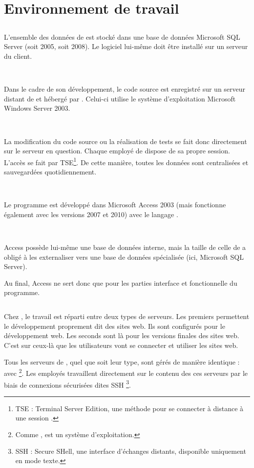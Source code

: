 \chapter{Environnement de travail}
\section{\solulog}
L'ensemble des données de \integrale{} est stocké dans une base de données Microsoft SQL Server (soit 2005, soit 2008). Le logiciel lui-même doit être installé sur un serveur du client.

~

Dans le cadre de son développement, le code source est enregistré sur un serveur distant de \solulog{} et hébergé par \fidit. Celui-ci utilise le système d'exploitation Microsoft Windows Server 2003.

~

La modification du code source ou la réalisation de tests se fait donc directement sur le serveur en question. Chaque employé de \solulog{} dispose de sa propre session. L'accès se fait par TSE\footnote{TSE : Terminal Server Edition, une méthode pour se connecter à distance à une session .}. De cette manière, toutes les données sont centralisées et sauvegardées quotidiennement.

~

Le programme \integrale{} est développé dans Microsoft Access 2003 (mais fonctionne également avec les versions 2007 et 2010) avec le langage \vb.

~

Access possède lui-même une base de données interne, mais la taille de celle de \integrale{} a obligé \solulog{} à les externaliser vers une base de données spécialisée (ici, Microsoft SQL Server).

Au final, Access ne sert donc que pour les parties interface et fonctionnelle du programme.

\section{\fidit}
Chez \fidit, le travail est réparti entre deux types de serveurs. Les premiers permettent le développement proprement dit des sites web. Ils sont configurés pour le développement web. Les seconds sont là pour les versions finales des sites web. C'est sur ceux-là que les utilisateurs vont se connecter et utiliser les sites web.

Tous les serveurs de \fidit, quel que soit leur type, sont gérés de manière identique : avec \footnote{Comme ,  est un système d'exploitation.}. Les employés travaillent directement sur le contenu des ces serveurs par le biais de connexions sécurisées dites \og SSH \fg\footnote{SSH : Secure SHell, une interface d'échanges distants, disponible uniquement en mode texte.}.

